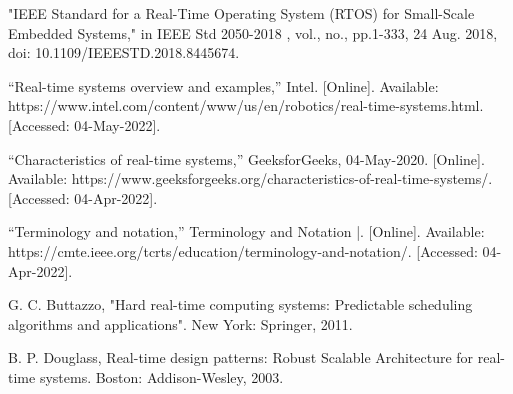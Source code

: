 \documentclass[conference]{IEEEtran}
\begin{document}
\begin{thebibliography}{00}

"IEEE Standard for a Real-Time Operating System (RTOS) for Small-Scale Embedded Systems," in IEEE Std 2050-2018 , vol., no., pp.1-333, 24 Aug. 2018, doi: 10.1109/IEEESTD.2018.8445674.

 “Real-time systems overview and examples,” Intel. [Online]. Available: https://www.intel.com/content/www/us/en/robotics/real-time-systems.html. [Accessed: 04-May-2022]. 

“Characteristics of real-time systems,” GeeksforGeeks, 04-May-2020. [Online]. Available: https://www.geeksforgeeks.org/characteristics-of-real-time-systems/. [Accessed: 04-Apr-2022]. 

 “Terminology and notation,” Terminology and Notation |. [Online]. Available: https://cmte.ieee.org/tcrts/education/terminology-and-notation/. [Accessed: 04-Apr-2022]. 

 G. C. Buttazzo, "Hard real-time computing systems: Predictable scheduling algorithms and applications". New York: Springer, 2011. 

 B. P. Douglass, Real-time design patterns: Robust Scalable Architecture for real-time systems. Boston: Addison-Wesley, 2003. 


\end{thebibliography}
\end{document}
